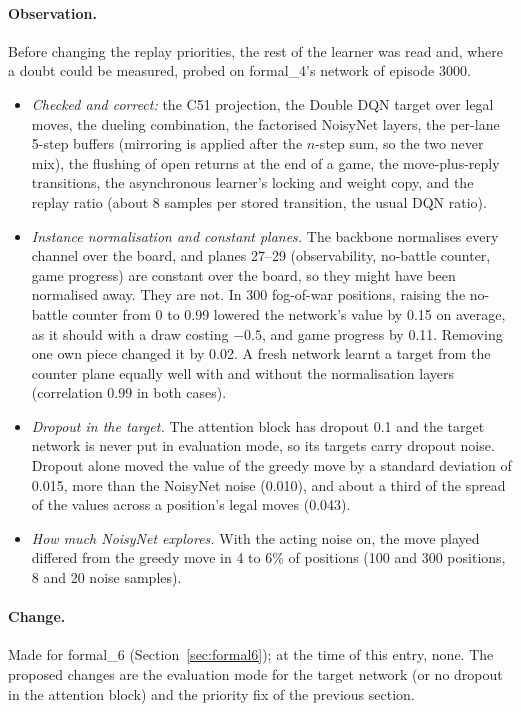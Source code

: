 \paragraph{Observation.} Before changing the replay priorities, the rest of the learner was read
and, where a doubt could be measured, probed on formal\_4's network of episode 3000.
\begin{itemize}
  \item \emph{Checked and correct:} the C51 projection, the Double DQN target over legal moves,
        the dueling combination, the factorised NoisyNet layers, the per-lane 5-step buffers
        (mirroring is applied after the $n$-step sum, so the two never mix), the flushing of
        open returns at the end of a game, the move-plus-reply transitions, the asynchronous
        learner's locking and weight copy, and the replay ratio (about 8 samples per stored
        transition, the usual DQN ratio).
  \item \emph{Instance normalisation and constant planes.} The backbone normalises every channel
        over the board, and planes 27--29 (observability, no-battle counter, game progress) are
        constant over the board, so they might have been normalised away. They are not. In 300
        fog-of-war positions, raising the no-battle counter from 0 to 0.99 lowered the network's
        value by 0.15 on average, as it should with a draw costing $-0.5$, and game progress
        by 0.11. Removing one own piece changed it by 0.02. A fresh network learnt a target
        from the counter plane equally well with and without the normalisation layers
        (correlation 0.99 in both cases).
  \item \emph{Dropout in the target.} The attention block has dropout 0.1 and the target network
        is never put in evaluation mode, so its targets carry dropout noise. Dropout alone moved
        the value of the greedy move by a standard deviation of 0.015, more than the NoisyNet
        noise (0.010), and about a third of the spread of the values across a position's legal
        moves (0.043).
  \item \emph{How much NoisyNet explores.} With the acting noise on, the move played differed
        from the greedy move in 4 to 6\% of positions (100 and 300 positions, 8 and 20 noise
        samples).
\end{itemize}

\paragraph{Change.} Made for formal\_6 (Section~\ref{sec:formal6}); at the time of this entry, none. The proposed changes are the evaluation mode for the target
network (or no dropout in the attention block) and the priority fix of the previous section.

